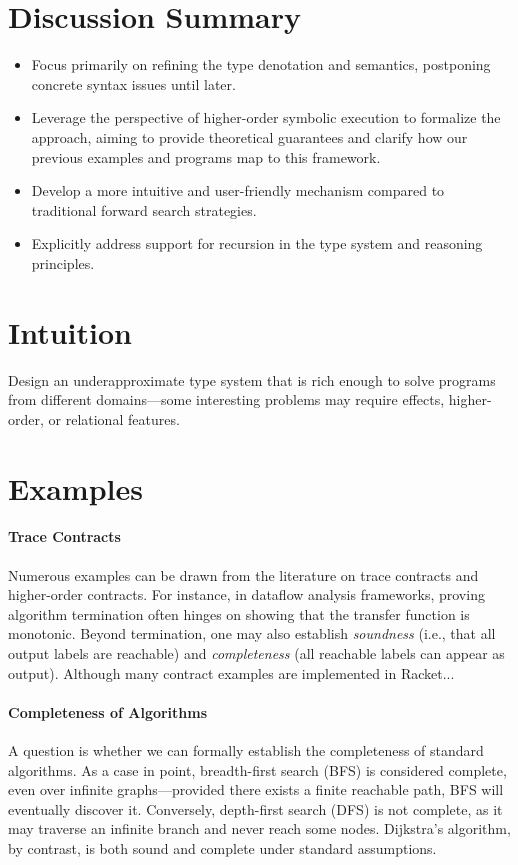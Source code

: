 \section{Discussion Summary}

\begin{itemize}
    \item Focus primarily on refining the type denotation and semantics, postponing concrete syntax issues until later.
    \item Leverage the perspective of higher-order symbolic execution to formalize the approach, aiming to provide theoretical guarantees and clarify how our previous examples and programs map to this framework.
    \item Develop a more intuitive and user-friendly mechanism compared to traditional forward search strategies.
    \item Explicitly address support for recursion in the type system and reasoning principles.
\end{itemize}

\section{Intuition}

Design an underapproximate type system that is rich enough to solve programs from different domains—some interesting problems may require effects, higher-order, or relational features.

\section{Examples}

\paragraph{Trace Contracts} Numerous examples can be drawn from the literature on trace contracts and higher-order contracts. For instance, in dataflow analysis frameworks, proving algorithm termination often hinges on showing that the transfer function is monotonic. Beyond termination, one may also establish \emph{soundness} (i.e., that all output labels are reachable) and \emph{completeness} (all reachable labels can appear as output). 
Although many contract examples are implemented in Racket...

\paragraph{Completeness of Algorithms} A question is whether we can formally establish the completeness of standard algorithms. As a case in point, breadth-first search (BFS) is considered complete, even over infinite graphs—provided there exists a finite reachable path, BFS will eventually discover it. Conversely, depth-first search (DFS) is not complete, as it may traverse an infinite branch and never reach some nodes. Dijkstra's algorithm, by contrast, is both sound and complete under standard assumptions.

